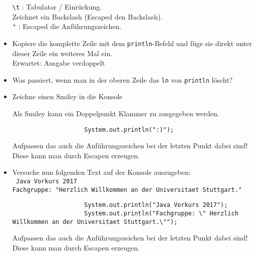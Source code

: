 \begin{questions}
\begin{parts}
\begin{itemize}
            \begin{solution}
                \texttt{\textbackslash t} : Tabulator / Einrückung. \\
                \texttt{\grqq \grqq} Zeichnet ein Backslash (Escaped den Backslash). \\
                \texttt{\grqq "} : Escaped die Anführungszeichen.
            \end{solution}

            \item Kopiere die komplette Zeile mit dem \texttt{println}-Befehl und füge sie direkt unter dieser Zeile ein weiteres Mal ein.\\
            Erwartet: Ausgabe verdoppelt
            \item Was passiert, wenn man in der oberen Zeile das \texttt{ln} von \texttt{println} löscht?
            \item Zeichne einen Smiley in die Konsole

            \begin{solution}
                Als Smiley kann ein Doppelpunkt Klammer zu ausgegeben werden.
                \begin{lstlisting}
                    System.out.println(":)");
                \end{lstlisting}
                Aufpassen das auch die Anführungszeichen bei der letzten Punkt dabei sind! Diese kann man durch Escapen erzeugen.
            \end{solution}

            \item Versuche nun folgenden Text auf der Konsole auszugeben:\\
            \texttt{
                Java Vorkurs 2017\\
                Fachgruppe: "Herzlich Willkommen an der Universitaet Stuttgart."
            }
            \begin{solution}
                \begin{lstlisting}
                    System.out.println("Java Vorkurs 2017");
                    System.out.println("Fachgruppe: \" Herzlich Willkommen an der Universitaet Stuttgart.\"");
                \end{lstlisting}
                Aufpassen das auch die Anführungszeichen bei der letzten Punkt dabei sind! Diese kann man durch Escapen erzeugen.
            \end{solution}
        \end{itemize}
    \end{parts}


\end{questions}
